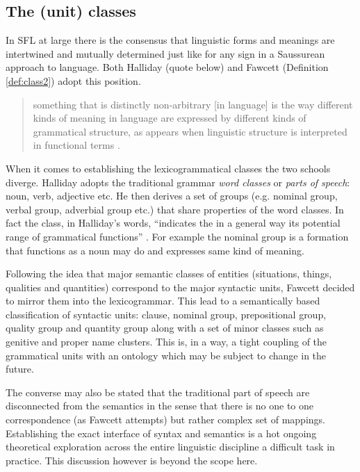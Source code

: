 \subsection{The (unit) classes}
\label{sec:unit-classes}

In SFL at large there is the consensus that linguistic forms and meanings are intertwined and mutually determined just like for any sign in a Saussurean approach to language. Both Halliday (quote below) and Fawcett (Definition \ref{def:class2}) adopt this position. 

\begin{quotation}
    something that is distinctly non-arbitrary [in language] is the way different kinds of meaning in language are expressed by different kinds of grammatical structure, as appears when linguistic structure is interpreted in functional terms \citep{Halliday2003-Ideas-about-language}.
\end{quotation}

When it comes to establishing the lexicogrammatical classes the two schools diverge. Halliday adopts the traditional grammar \textit{word classes} or \textit{parts of speech}: noun, verb, adjective etc. He then derives a set of groups (e.g. nominal group, verbal group, adverbial group etc.) that share properties of the word classes. In fact the class, in Halliday's words, ``indicates the in a general way its potential range of grammatical functions'' \citep[76]{Halliday2013}. For example the nominal group is a formation that functions as a noun may do and expresses same kind of meaning. 

Following the idea that major semantic classes of entities (situations, things, qualities and quantities) correspond to the major syntactic units, Fawcett decided to mirror them into the lexicogrammar. This lead to a semantically based classification of syntactic units: clause, nominal group, prepositional group, quality group and quantity group \citep[193--194]{Fawcett2000} along with a set of minor classes such as genitive and proper name clusters. This is, in a way, a tight coupling of the grammatical units with an ontology which may be subject to change in the future. 

The converse may also be stated that the traditional part of speech are disconnected from the semantics in the sense that there is no one to one correspondence (as Fawcett attempts) but rather complex set of mappings. Establishing the exact interface of syntax and semantics is a hot ongoing theoretical exploration across the entire linguistic discipline a difficult task in practice. This discussion however is beyond the scope here.   

